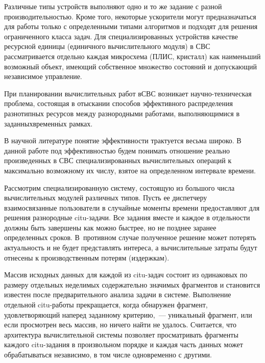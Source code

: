 \begin{multicols}{2}
Различные типы устройств выполняют одно и то же задание с разной
производительностью. Кроме того, некоторые ускорители могут
предназначаться  для работы только с определенными типами алгоритмов
и подходят для решения ограниченного класса задач. Для
специализированных устройств\linebreak в качестве ресурсной единицы
(единичного вы\-чис\-ли\-тель\-но\-го модуля) в СВС рассматривается отдельно
каж\-дая микросхема (ПЛИС, кристалл) как наимень\-ший возможный объект,
имеющий собственное множество состояний и допускающий независимое
управление.

При планировании вычислительных работ в\linebreak СВС возникает
на\-уч\-но-тех\-ни\-че\-ская проб\-ле\-ма, состоящая в отыскании способов
эффективного распределения разнотипных ресурсов между разнородными
работами, выполняющимися в заданных\linebreak  временн$\acute{\mbox{ы}}$х рамках.

В научной литературе понятие эффективности трактуется весьма широко.
В данной работе под эффективностью будем понимать отношение реально
произведенных в СВС специализированных вычислительных операций к
максимально возможному их числу, взятое на определенном интервале
времени.

Рассмотрим специализированную систему, состоящую из большого числа
вычислительных модулей различных типов. Пусть ее диспетчеру
взаимосвязанные пользователи в случайные моменты времени
предоставляют для решения разнородные  citu-за\-да\-чи. Все задания
вместе и каж\-дое в отдельности должны быть завершены  как можно
быстрее, но не позднее заранее определенных сроков. В~противном
случае полученное решение может потерять актуальность и не будет
представлять интереса, а вычислительные затраты будут отнесены к
производственным потерям (издержкам).

Массив исходных данных для каж\-дой из citu-за\-дач состоит из
одинаковых по размеру отдельных неделимых содержательно значимых
фрагментов и становится известен после предварительного анализа
задачи в  системе. Выполнение отдельной  citu-ра\-бо\-ты прекращается,
когда обнаружен фрагмент, удовлетворяющий наперед заданному
критерию,~--- уникальный фрагмент, или если просмотрен весь массив,
но ничего найти не удалось. Считается, что архитектура
вычислительной системы позволяет просматривать  фрагменты каж\-до\-го
citu-за\-да\-ния  в произвольном порядке и каж\-дая часть данных может
обрабатываться независимо, в том числе одновременно  с другими.


\end{multicols}
